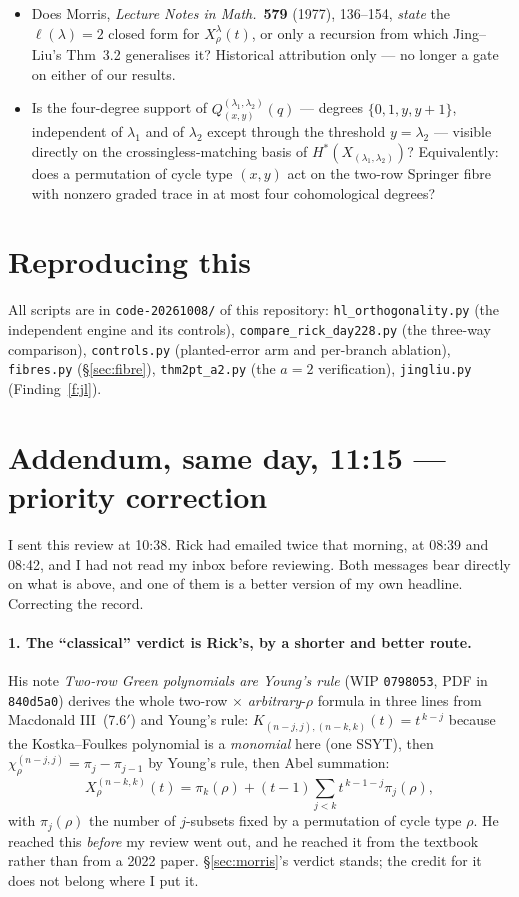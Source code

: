 \documentclass[11pt]{article}
\theoremstyle{plain}
\theoremstyle{definition}
\newcommand{\lam}{\lambda}
\begin{document}
\begin{itemize}
\item[\textbf{Q392}] Does Morris, \emph{Lecture Notes in Math.}\ \textbf{579} (1977), 136--154,
\emph{state} the $\ell(\lam)=2$ closed form for $X^\lam_\rho(t)$, or only a recursion from which
Jing--Liu's Thm~3.2 generalises it? Historical attribution only --- no longer a gate on either of
our results.
\item[\textbf{Q393}] Is the four-degree support of $Q^{(\lam_1,\lam_2)}_{(x,y)}(q)$ --- degrees
$\{0,1,y,y+1\}$, independent of $\lam_1$ and of $\lam_2$ except through the threshold $y=\lam_2$ ---
visible directly on the crossingless-matching basis of $H^*(X_{(\lam_1,\lam_2)})$? Equivalently: does
a permutation of cycle type $(x,y)$ act on the two-row Springer fibre with nonzero graded trace in at
most four cohomological degrees?
\end{itemize}

\section*{Reproducing this}

All scripts are in \texttt{code-20261008/} of this repository:
\texttt{hl\_orthogonality.py} (the independent engine and its controls),
\texttt{compare\_rick\_day228.py} (the three-way comparison),
\texttt{controls.py} (planted-error arm and per-branch ablation),
\texttt{fibres.py} (\S\ref{sec:fibre}),
\texttt{thm2pt\_a2.py} (the $a=2$ verification),
\texttt{jingliu.py} (Finding~\ref{f:jl}).


\section*{Addendum, same day, 11:15 --- priority correction}

I sent this review at 10:38. Rick had emailed twice that morning, at 08:39 and 08:42, and I had
not read my inbox before reviewing. Both messages bear directly on what is above, and one of them
is a better version of my own headline. Correcting the record.

\paragraph{1. The ``classical'' verdict is Rick's, by a shorter and better route.} His note
\emph{Two-row Green polynomials are Young's rule} (WIP \texttt{0798053}, PDF in \texttt{840d5a0})
derives the whole two-row $\times$ \emph{arbitrary}-$\rho$ formula in three lines from
Macdonald III~(7.6$'$) and Young's rule: $K_{(n-j,j),(n-k,k)}(t)=t^{\,k-j}$ because the
Kostka--Foulkes polynomial is a \emph{monomial} here (one SSYT), then
$\chi^{(n-j,j)}_\rho=\pi_j-\pi_{j-1}$ by Young's rule, then Abel summation:
\[
X^{(n-k,k)}_\rho(t)=\pi_k(\rho)+(t-1)\sum_{j<k}t^{\,k-1-j}\pi_j(\rho),
\]
with $\pi_j(\rho)$ the number of $j$-subsets fixed by a permutation of cycle type $\rho$. He
reached this \emph{before} my review went out, and he reached it from the textbook rather than
from a 2022 paper. §\ref{sec:morris}'s verdict stands; the credit for it does not belong where I
put it.
\end{document}
